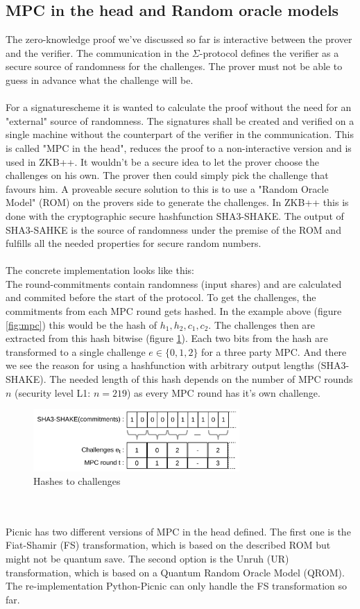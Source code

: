 \documentclass[]{article}
\begin{document}
\subsection{MPC in the head and Random oracle models}
The zero-knowledge proof we've discussed so far is interactive between the prover and the verifier. The communication in the $\Sigma$-protocol defines the verifier as a secure source of randomness for the challenges. The prover must not be able to guess in advance what the challenge will be.\\ \\ 
For a signaturescheme it is wanted to calculate the proof without the need for an "external" source of randomness. The signatures shall be created and verified on a single machine without the counterpart of the verifier in the communication. This is called "MPC in the head", reduces the proof to a non-interactive version and is used in ZKB++. It wouldn't be a secure idea to let the prover choose the challenges on his own. The prover then could simply pick the challenge that favours him. A proveable secure solution to this is to use a "Random Oracle Model" (ROM) on the provers side to generate the challenges. In ZKB++ this is done with the cryptographic secure hashfunction SHA3-SHAKE. The output of SHA3-SAHKE is the source of randomness under the premise of the ROM and fulfills all the needed properties for secure random numbers.\\ \\
The concrete implementation looks like this:\\
The round-commitments contain randomness (input shares) and are calculated and commited before the start of the protocol. To get the challenges, the commitments from each MPC round gets hashed. In the example above (figure \ref{fig:mpc}) this would be the hash of $h_1, h_2, c_1, c_2$. The challenges then are extracted from this hash bitwise (figure \ref{fig:challenges}). Each two bits from the hash are transformed to a single challenge $e \in \{0,1,2\}$ for a three party MPC. And there we see the reason for using a hashfunction with arbitrary output lengths (SHA3-SHAKE). The needed length of this hash depends on the number of MPC rounds $n$ (security level L1: $n=219$) as every MPC round has it's own challenge.\\
\begin{figure}[htbp]
\center
\includegraphics[width=0.7\textwidth]{pics/challenges.pdf}
\caption{Hashes to challenges}
\label{fig:challenges}
\end{figure}\\ \\
Picnic has two different versions of MPC in the head defined. The first one is the Fiat-Shamir (FS) transformation, which is based on the described ROM but might not be quantum save. The second option is the Unruh (UR) transformation, which is based on a Quantum Random Oracle Model (QROM). The re-implementation Python-Picnic can only handle the FS transformation so far. 
\end{document}
